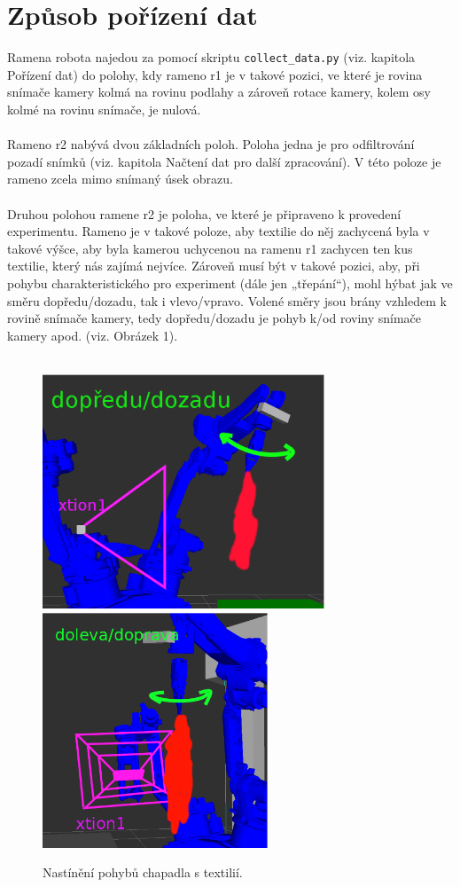 \documentclass[10pt,a4paper,titlepage,oneside]{book}
\begin{document}
\section*{Způsob pořízení dat}
Ramena robota najedou za pomocí skriptu \verb|collect_data.py| (viz. kapitola Pořízení dat) do polohy, kdy rameno r1 je v takové pozici, ve které je rovina snímače kamery kolmá na rovinu podlahy a zároveň rotace kamery, kolem osy kolmé na rovinu snímače, je nulová.\\
\\
Rameno r2 nabývá dvou základních poloh. Poloha jedna je pro odfiltrování pozadí snímků (viz. kapitola Načtení dat pro další zpracování). V této poloze je rameno zcela mimo snímaný úsek obrazu.\\
\\ 
Druhou polohou ramene r2 je poloha, ve které je připraveno k provedení experimentu. Rameno je v takové poloze, aby textilie do něj zachycená byla v takové výšce, aby byla kamerou uchycenou na ramenu r1 zachycen ten kus textilie, který nás zajímá nejvíce. Zároveň musí být v takové pozici, aby, při pohybu charakteristického pro experiment (dále jen „třepání“), mohl hýbat jak ve směru dopředu/dozadu, tak i vlevo/vpravo. Volené směry jsou brány vzhledem k rovině snímače kamery, tedy dopředu/dozadu je pohyb k/od roviny snímače kamery apod. (viz. Obrázek 1).\\
\\
\begin{figure}[H]
	\centering  	
  	\includegraphics[height=7cm]{pictures/obrazek1.eps}
  	\includegraphics[height=7cm]{pictures/obrazek2.eps}
  	\caption{Nastínění pohybů chapadla s textilií.}
  	\label{fig:obrazek1}
\end{figure}
\end{document}

